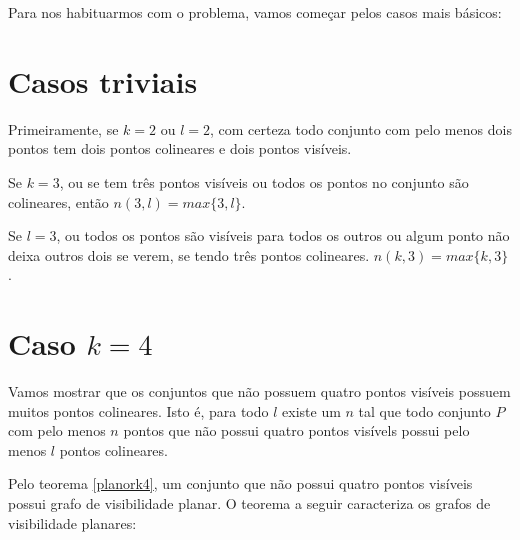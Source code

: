 \documentclass[a4paper]{book}
\begin{document}
Para nos habituarmos com o problema, vamos começar pelos casos mais básicos:

\section{Casos triviais}
Primeiramente, se $k=2$ ou $l=2$, com certeza todo conjunto com pelo menos dois pontos tem dois pontos colineares e dois pontos visíveis.

Se $k=3$, ou se tem três pontos visíveis ou todos os pontos no conjunto são colineares, então $n(3,l)=max\{3,l\}$.

Se $l=3$, ou todos os pontos são visíveis para todos os outros ou algum ponto não deixa outros dois se verem, se tendo três pontos colineares. $n(k,3) = max\{k,3\}$.


\section{Caso $k=4$}
Vamos mostrar que os conjuntos que não possuem quatro pontos visíveis possuem muitos pontos colineares. Isto é, para todo $l$ existe um $n$ tal que todo conjunto $P$ com pelo menos $n$ pontos que não possui quatro pontos visívels possui pelo menos $l$ pontos colineares.

Pelo teorema \ref{planork4}, um conjunto que não possui quatro pontos visíveis possui grafo de visibilidade planar. O teorema a seguir caracteriza os grafos de visibilidade planares:
\end{document}
